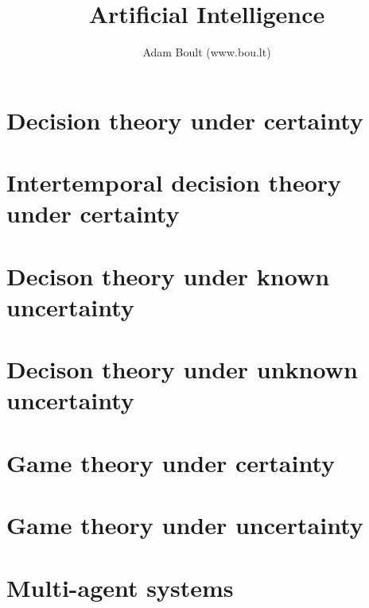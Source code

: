 \documentclass[oneside]{book}
\begin{document}
\author{Adam Boult (www.bou.lt)}
\title{Artificial Intelligence}
\maketitle

\setcounter{tocdepth}{1}
\tableofcontents



\part{Decision theory under certainty}




\part{Intertemporal decision theory under certainty}




\part{Decison theory under known uncertainty}



\part{Decison theory under unknown uncertainty}






\part{Game theory under certainty}





\part{Game theory under uncertainty}



\part{Multi-agent systems}
\end{document}
